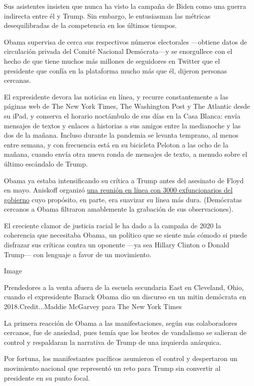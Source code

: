 Sus asistentes insisten que nunca ha visto la campaña de Biden como una
guerra indirecta entre él y Trump. Sin embargo, le entusiasman las
métricas desequilibradas de la competencia en los últimos tiempos.

Obama supervisa de cerca sus respectivos números electorales ---obtiene
datos de circulación privada del Comité Nacional Demócrata---y se
enorgullece con el hecho de que tiene muchos más millones de seguidores
en Twitter que el presidente que confía en la plataforma mucho más que
él, dijeron personas cercanas.

El expresidente devora las noticias en línea, y recurre constantemente a
las páginas web de The New York Times, The Washington Post y The
Atlantic desde su iPad, y conserva el horario noctámbulo de sus días en
la Casa Blanca: envía mensajes de textos y enlaces a historias a sus
amigos entre la medianoche y las dos de la mañana. Incluso durante la
pandemia se levanta temprano, al menos entre semana, y con frecuencia
está en su bicicleta Peloton a las ocho de la mañana, cuando envía otra
nueva ronda de mensajes de texto, a menudo sobre el último escándalo de
Trump.

Obama ya estaba intensificando su crítica a Trump antes del asesinato de
Floyd en mayo. Aniskoff organizó
\href{https://www.nytimes.com/2020/05/09/us/politics/obama-flynn-coronavirus-trump.html}{una
reunión en línea con 3000 exfuncionarios del gobierno} cuyo propósito,
en parte, era suavizar su línea más dura. (Demócratas cercanos a Obama
filtraron amablemente la grabación de sus observaciones).

El creciente clamor de justicia racial le ha dado a la campaña de 2020
la coherencia que necesitaba Obama, un político que se siente más cómodo
si puede disfrazar sus críticas contra un oponente ---ya sea Hillary
Clinton o Donald Trump--- con lenguaje a favor de un movimiento.

Image

Prendedores a la venta afuera de la escuela secundaria East en
Cleveland, Ohio, cuando el expresidente Barack Obama dio un discurso en
un mitin demócrata en 2018.Credit...Maddie McGarvey para The New York
Times

La primera reacción de Obama a las manifestaciones, según sus
colaboradores cercanos, fue de ansiedad, pues temía que los brotes de
vandalismo se salieran de control y respaldaran la narrativa de Trump de
una izquierda anárquica.

Por fortuna, los manifestantes pacíficos asumieron el control y
despertaron un movimiento nacional que representó un reto para Trump sin
convertir al presidente en su punto focal.

